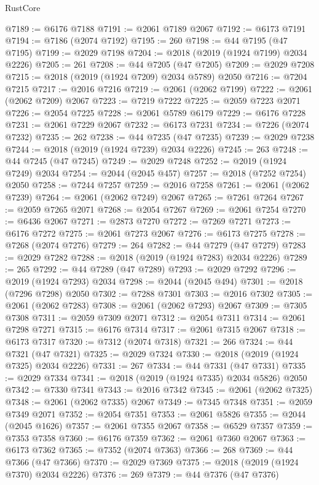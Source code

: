 \begin{lexlean}{RustCore}
\begin{coremodule}
@7189 := @6176 @7188
@7191 := @2061 @7189 @2067
@7192 := @6173 @7191
@7194 := @7186 (@2074 @7192)
@7195 := 260
@7198 := @44 @7195 (@47 @7195)
@7199 := @2029 @7198
@7204 := @2018 (@2019 (@1924 @7199) @2034 @2226)
@7205 := 261
@7208 := @44 @7205 (@47 @7205)
@7209 := @2029 @7208
@7215 := @2018 (@2019 (@1924 @7209) @2034 @5789) @2050
@7216 := @7204 @7215
@7217 := @2016 @7216
@7219 := @2061 (@2062 @7199)
@7222 := @2061 (@2062 @7209) @2067
@7223 := @7219 @7222
@7225 := @2059 @7223 @2071
@7226 := @2054 @7225
@7228 := @2061 @5789 @6179
@7229 := @6176 @7228
@7231 := @2061 @7229 @2067
@7232 := @6173 @7231
@7234 := @7226 (@2074 @7232)
@7235 := 262
@7238 := @44 @7235 (@47 @7235)
@7239 := @2029 @7238
@7244 := @2018 (@2019 (@1924 @7239) @2034 @2226)
@7245 := 263
@7248 := @44 @7245 (@47 @7245)
@7249 := @2029 @7248
@7252 := @2019 (@1924 @7249) @2034
@7254 := @2044 (@2045 @457)
@7257 := @2018 (@7252 @7254) @2050
@7258 := @7244 @7257
@7259 := @2016 @7258
@7261 := @2061 (@2062 @7239)
@7264 := @2061 (@2062 @7249) @2067
@7265 := @7261 @7264
@7267 := @2059 @7265 @2071
@7268 := @2054 @7267
@7269 := @2061 @7254
@7270 := @6436 @2067
@7271 := @2873 @7270
@7272 := @7269 @7271
@7273 := @6176 @7272
@7275 := @2061 @7273 @2067
@7276 := @6173 @7275
@7278 := @7268 (@2074 @7276)
@7279 := 264
@7282 := @44 @7279 (@47 @7279)
@7283 := @2029 @7282
@7288 := @2018 (@2019 (@1924 @7283) @2034 @2226)
@7289 := 265
@7292 := @44 @7289 (@47 @7289)
@7293 := @2029 @7292
@7296 := @2019 (@1924 @7293) @2034
@7298 := @2044 (@2045 @494)
@7301 := @2018 (@7296 @7298) @2050
@7302 := @7288 @7301
@7303 := @2016 @7302
@7305 := @2061 (@2062 @7283)
@7308 := @2061 (@2062 @7293) @2067
@7309 := @7305 @7308
@7311 := @2059 @7309 @2071
@7312 := @2054 @7311
@7314 := @2061 @7298 @7271
@7315 := @6176 @7314
@7317 := @2061 @7315 @2067
@7318 := @6173 @7317
@7320 := @7312 (@2074 @7318)
@7321 := 266
@7324 := @44 @7321 (@47 @7321)
@7325 := @2029 @7324
@7330 := @2018 (@2019 (@1924 @7325) @2034 @2226)
@7331 := 267
@7334 := @44 @7331 (@47 @7331)
@7335 := @2029 @7334
@7341 := @2018 (@2019 (@1924 @7335) @2034 @5826) @2050
@7342 := @7330 @7341
@7343 := @2016 @7342
@7345 := @2061 (@2062 @7325)
@7348 := @2061 (@2062 @7335) @2067
@7349 := @7345 @7348
@7351 := @2059 @7349 @2071
@7352 := @2054 @7351
@7353 := @2061 @5826
@7355 := @2044 (@2045 @1626)
@7357 := @2061 @7355 @2067
@7358 := @6529 @7357
@7359 := @7353 @7358
@7360 := @6176 @7359
@7362 := @2061 @7360 @2067
@7363 := @6173 @7362
@7365 := @7352 (@2074 @7363)
@7366 := 268
@7369 := @44 @7366 (@47 @7366)
@7370 := @2029 @7369
@7375 := @2018 (@2019 (@1924 @7370) @2034 @2226)
@7376 := 269
@7379 := @44 @7376 (@47 @7376)

\end{coremodule}
\end{lexlean}
